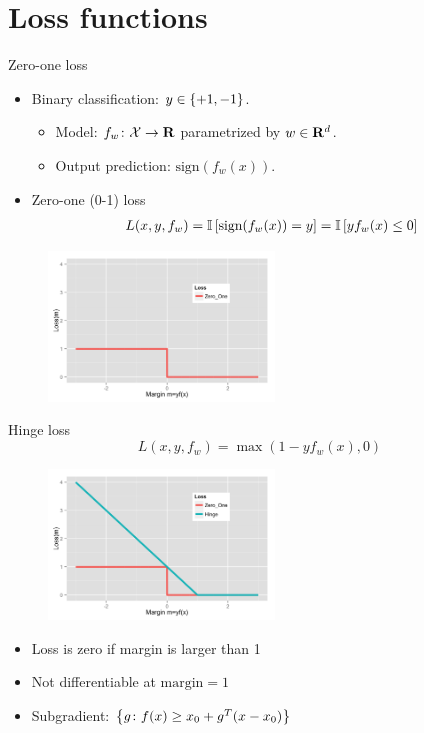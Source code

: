 \documentclass[usenames,dvipsnames,notes,11pt,aspectratio=169]{beamer}
\begin{document}
\section{Loss functions}

\begin{frame}
    {Zero-one loss}
    \begin{itemize}
        \item Binary classification: $y\in\left\{ +1, -1 \right\}$.
            \begin{itemize}
                \item Model: $f_w\colon \mathcal{X} \rightarrow \mathbf{R}$ parametrized by $w \in \mathbf{R}^d$.
                \item Output prediction: $\text{sign}(f_w(x))$.
            \end{itemize}
        \item Zero-one (0-1) loss
            \begin{align}
                L(x, y, f_w) = \mathbb{I}\left[ \text{sign}(f_w(x)) = y \right] 
                = \mathbb{I}\left[ {yf_w(x)} \le 0 \right]
            \end{align}
    \end{itemize}
    \begin{figure}
        \includegraphics[height=4cm]{figures/loss.Zero_One.png}
    \end{figure}
    \pause
\end{frame}

\begin{frame}
    {Hinge loss}
    $$
    L(x,y,f_w) = \max(1-yf_w(x), 0)
    $$
    \begin{figure}
        \includegraphics[height=4cm]{figures/loss.Zero_One.Hinge.png}
    \end{figure}
    \begin{itemize}
        \item Loss is zero if margin is larger than 1
        \item Not differentiable at $\text{margin}=1$
        \item Subgradient: $\left\{ g\colon f(x) \ge x_0 + g^T(x-x_0) \right\}$
    \end{itemize}
\end{frame}
\end{document}
